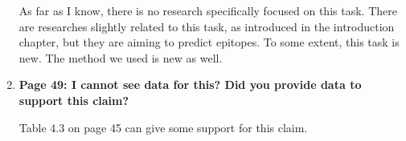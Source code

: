 \documentclass[11pt]{article}
\begin{document}
\begin{enumerate}
As far as I know, there is no research specifically focused on this task. There are researches slightly related to this task, as introduced in the introduction chapter, but they are aiming to predict epitopes. To some extent, this task is new. The method we used is new as well.

\item \textbf{Page 49: I cannot see data for this? Did you provide data to support this claim?}

Table 4.3 on page 45 can give some support for this claim.




\end{enumerate}
\end{document}
